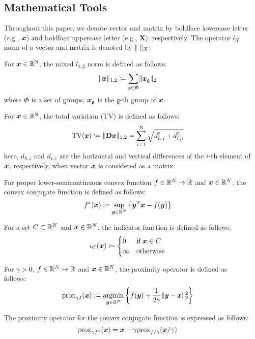\subsection{Mathematical Tools}\label{subsec:mathematical-tools}

Throughout this paper, we denote vector and matrix by boldface lowercase letter (e.g., $\vecx$) and boldface uppercase letter (e.g., $\bm{X}$), respectively.
The operator $l_{X}$ norm of a vector and matrix is denoted by $\Norm{\cdot}__{X}$.

For $\vecx \in \realNumber^{\intN}$, the mixed $l_{1,2}$ norm is defined as follows:
\begin{equation} \label{eq:L12NormDefinitionEq} \LOneTwoNormDefinition \end{equation}
where $\mathfrak{G}$ is a set of groups, $\vecx_{\mathfrak{g}}$ is the $\mathfrak{g}$-th group of $\vecx$.

For $\vecx \in \realNumber^{\intN}$, the total variation (TV)\cite{TV} is defined as follows:
\begin{equation} \label{eq:TVDefinitionEq} \TotalVariationDefinition \end{equation}
here, $d_{h,i}$ and $d_{v,i}$ are the horizontal and vertical differences of the $i$-th element of $\vecx$, respectively, when vector $\vecx$ is considered as a matrix.

For proper lower-semicontinuous convex function $f \in \realNumber^N \to \realNumber$ and $\vecx \in \realNumber^N$, the convex conjugate function is defined as follows:
\begin{equation} \label{eq:ConjugateFunctionDefinitionEq} \conjugateFunctionDefinition \end{equation}

For a set $C \subset \realNumber^N$ and $\vecx \in \realNumber^N$, the indicator function is defined as follows:
\begin{equation} \label{eq:IndicatorFunctionDefinitionEq} \indicatorFunctionDefinition \end{equation}

For $\gamma > 0$, $f \in \realNumber^N \to \realNumber$ and $\vecx \in \realNumber^N$, the proximity operator is defined as follows:
\begin{equation} \label{eq:ProximityOperatorDefinitionEq} \proximityOperatorDefinition \end{equation}

The proximity operator for the convex conjugate function is expressed as follows\cite[Theorem 3.1 (ii)]{prox-convex-conjugate-function}:
\begin{equation} \label{eq:ProximityOperatorDefinitionWithConvexConjugateFunctionEq} \proximityOperatorDefinitionWithConvexConjugateFunction \end{equation}

